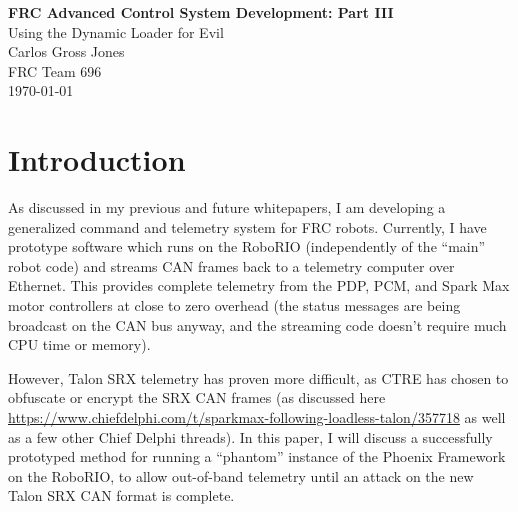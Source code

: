 \documentclass[12pt]{article}
\begin{document}
	\begin{titlepage}
	\begin{center}
		
	
	\vspace*{1in}
	{\Huge \textbf{FRC Advanced Control System Development: Part III}}\\
	\vspace{0.25in}
	{\LARGE Using the Dynamic Loader for Evil}\\
	\vspace{0.5in}
	{\Large Carlos Gross Jones}\\
	\vspace{0.1in}
	{\Large FRC Team 696}\\
	\vspace{0.1in}
	{\Large \today}\\
\end{center}
	
\end{titlepage}


\section{Introduction}
\par As discussed in my previous and future whitepapers, I am developing a generalized command and telemetry system for FRC robots. Currently, I have prototype software which runs on the RoboRIO (independently of the ``main'' robot code) and streams CAN frames back to a telemetry computer over Ethernet. This provides complete telemetry from the PDP, PCM, and Spark Max motor controllers at close to zero overhead (the status messages are being broadcast on the CAN bus anyway, and the streaming code doesn't require much CPU time or memory). 
\par However, Talon SRX telemetry has proven more difficult, as CTRE has chosen to obfuscate or encrypt the SRX CAN frames (as discussed here \url{https://www.chiefdelphi.com/t/sparkmax-following-loadless-talon/357718} as well as a few other Chief Delphi threads). In this paper, I will discuss a successfully prototyped method for running a ``phantom'' instance of the Phoenix Framework on the RoboRIO, to allow out-of-band telemetry until an attack on the new Talon SRX CAN format is complete. 
\end{document}
